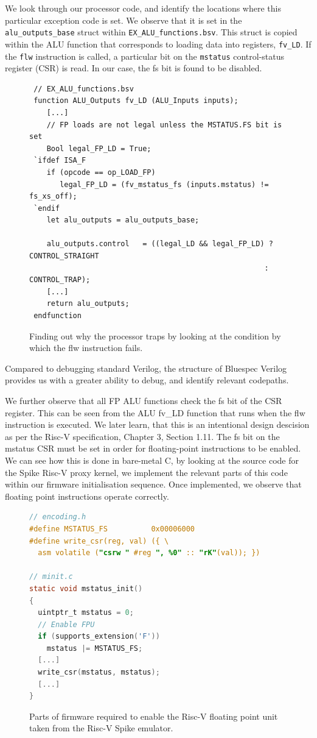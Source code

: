 \documentclass[a4paper,8pt]{report}
\begin{document}
We look through our processor code, and identify the locations where this
particular exception code is set. We observe that it is set in the
\texttt{alu\_outputs\_base} struct within \texttt{EX\_ALU\_functions.bsv}. This
struct is copied within the ALU function that corresponds to loading data into
registers, \texttt{fv\_LD}. If the \texttt{flw} instruction is called, a
particular bit on the \texttt{mstatus} control-status register (CSR) is read. In
our case, the fs bit is found to be disabled.
\begin{figure}[h]
\begin{verbatim}
 // EX_ALU_functions.bsv
 function ALU_Outputs fv_LD (ALU_Inputs inputs);
    [...]
    // FP loads are not legal unless the MSTATUS.FS bit is set
    Bool legal_FP_LD = True;
 `ifdef ISA_F
    if (opcode == op_LOAD_FP)
       legal_FP_LD = (fv_mstatus_fs (inputs.mstatus) != fs_xs_off);
 `endif
    let alu_outputs = alu_outputs_base;

    alu_outputs.control   = ((legal_LD && legal_FP_LD) ? CONTROL_STRAIGHT
                                                      : CONTROL_TRAP);
    [...]
    return alu_outputs;
 endfunction
\end{verbatim}
\caption{Finding out why the processor traps by looking at the condition by
  which the flw instruction fails.}
\end{figure}

Compared to debugging standard Verilog, the structure of Bluespec Verilog
provides us with a greater ability to debug, and identify relevant codepaths.

We further observe that all FP ALU functions check the fs bit of the CSR register.
This can be seen from the ALU fv\_LD function that runs when the flw instruction
is executed. We later learn, that this is an intentional design descision as per
the Risc-V specification, Chapter 3, Section 1.11. The fs bit on the mstatus CSR must be
set in order for floating-point instructions to be enabled. We can see how this
is done in bare-metal C, by looking at the source code for the Spike Risc-V
proxy kernel, we implement the relevant parts of this code within our firmware
initialisation sequence. Once implemented, we observe that floating point
instructions operate correctly.
\begin{figure}[h]
\begin{lstlisting}[language=C,style=customc]
// encoding.h
#define MSTATUS_FS          0x00006000
#define write_csr(reg, val) ({ \
  asm volatile ("csrw " #reg ", %0" :: "rK"(val)); })

// minit.c
static void mstatus_init()
{
  uintptr_t mstatus = 0;
  // Enable FPU
  if (supports_extension('F'))
    mstatus |= MSTATUS_FS;
  [...]
  write_csr(mstatus, mstatus);
  [...]
}
\end{lstlisting}
\caption{Parts of firmware required to enable the Risc-V floating point unit
  taken from the Risc-V Spike emulator.}
\end{figure}
\end{document}
